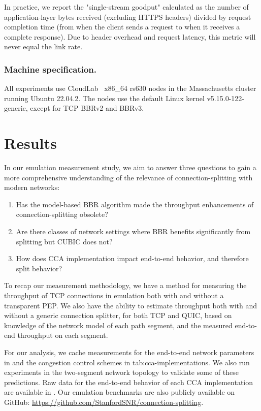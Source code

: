 In practice, we report the "single-stream goodput" calculated as the number of
application-layer bytes received (excluding HTTPS headers) divided by request
completion time (from when the client sends a request to when it receives a
complete response). Due to header overhead and request latency, this metric
will never equal the link rate.

\subsubsection{Machine specification.} All experiments use CloudLab~\cite
 {duplyakin2019design} x86\_64 rs630 nodes in the Massachusetts cluster running
 Ubuntu 22.04.2. The nodes use the default Linux kernel v5.15.0-122-generic,
 except for TCP BBRv2 and BBRv3.%

\section{Results}
\label{sec:splitting:results}



In our emulation measurement study, we aim to answer three questions to gain a
more comprehensive understanding of the relevance of connection-splitting with
modern networks:

\begin{enumerate}[noitemsep]
    \item Has the model-based BBR algorithm made the throughput enhancements of
     connection-splitting obsolete?
    \item Are there classes of network settings where BBR benefits significantly
     from splitting but CUBIC does not?
    \item How does CCA implementation impact end-to-end behavior, and therefore split
     behavior?
\end{enumerate}

\noindent To recap our measurement methodology, we have a method for
 measuring the throughput of TCP connections in emulation both with and without a
 transparent PEP. We also have the ability to estimate throughput both with and
 without a generic connection splitter, for both TCP and QUIC, based on
 knowledge of the network model of each path segment, and the measured end-to-end
 throughput on each segment.

For our analysis, we cache measurements for the end-to-end network parameters
in  and the congestion control schemes in \Cref
{tab:cca-implementations}. We also run experiments in the two-segment network topology
to validate some of these predictions. Raw data for the end-to-end
behavior of each CCA implementation are available in .
Our emulation benchmarks are also publicly available on GitHub: \url{https://github.com/StanfordSNR/connection-splitting}.


